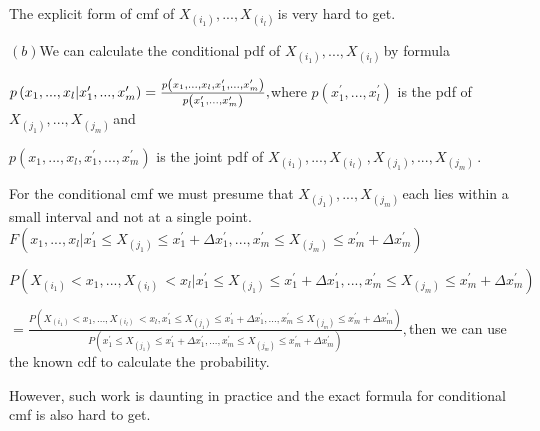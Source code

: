\documentclass{article}
\begin{document}
The explicit form of cmf of $X_{\left( i_{1}\right) },...,X_{\left(
i_{l}\right) \ }$is very hard to get.

$\left( b\right) $We can calculate the conditional pdf of $X_{\left(
i_{1}\right) },...,X_{\left( i_{l}\right) \ }$by formula

$p\left( x_{1},...,x_{l}|x_{1}^{\prime },...,x_{m}^{\prime }\right) =\frac{%
p\left( x_{1},...,x_{l},x_{1}^{\prime },...,x_{m}^{\prime }\right) }{p\left(
x_{1}^{\prime },...,x_{m}^{\prime }\right) },$where $p\left( x_{1}^{\prime
},...,x_{l}^{\prime }\right) $ is the pdf of $X_{\left( j_{1}\right)
},...,X_{\left( j_{m}\right) \ }$and

$p\left( x_{1},...,x_{l},x_{1}^{\prime },...,x_{m}^{\prime }\right) $ is the
joint pdf of $X_{\left( i_{1}\right) },...,X_{\left( i_{l}\right) \
},X_{\left( j_{1}\right) },...,X_{\left( j_{m}\right) \ }.$

For the conditional cmf we must presume that $X_{\left( j_{1}\right)
},...,X_{\left( j_{m}\right) \ }$each lies within a small interval and not
at a single point. $F\left( x_{1},...,x_{l}|x_{1}^{\prime }\leq X_{\left(
j_{1}\right) }\leq x_{1}^{\prime }+\Delta x_{1}^{\prime },...,x_{m}^{\prime
}\leq X_{\left( j_{m}\right) }\leq x_{m}^{\prime }+\Delta x_{m}^{\prime
}\right) $

$P\left( X_{\left( i_{1}\right) }<x_{1},...,X_{\left( i_{l}\right) \
}<x_{l}|x_{1}^{\prime }\leq X_{\left( j_{1}\right) }\leq x_{1}^{\prime
}+\Delta x_{1}^{\prime },...,x_{m}^{\prime }\leq X_{\left( j_{m}\right)
}\leq x_{m}^{\prime }+\Delta x_{m}^{\prime }\right) $

$=\frac{P\left( X_{\left( i_{1}\right) }<x_{1},...,X_{\left( i_{l}\right) \
}<x_{l},x_{1}^{\prime }\leq X_{\left( j_{1}\right) }\leq x_{1}^{\prime
}+\Delta x_{1}^{\prime },...,x_{m}^{\prime }\leq X_{\left( j_{m}\right)
}\leq x_{m}^{\prime }+\Delta x_{m}^{\prime }\right) }{P\left( x_{1}^{\prime
}\leq X_{\left( j_{1}\right) }\leq x_{1}^{\prime }+\Delta x_{1}^{\prime
},...,x_{m}^{\prime }\leq X_{\left( j_{m}\right) }\leq x_{m}^{\prime
}+\Delta x_{m}^{\prime }\right) },$then we can use the known cdf to
calculate the probability.

However, such work is daunting in practice and the exact formula for
conditional cmf is also hard to get.

\bigskip 
\end{document}
